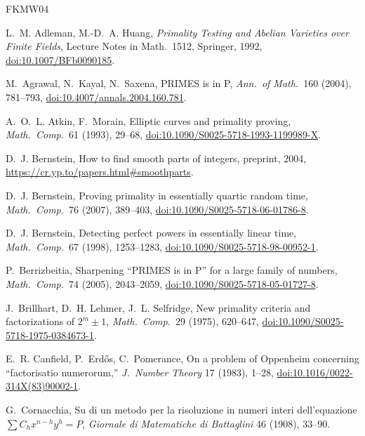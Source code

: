 \documentclass[11pt]{amsart}
\theoremstyle{plain}
\theoremstyle{definition}
\theoremstyle{remark}
\begin{document}
\begin{thebibliography}{FKMW04}

 L.~M. Adleman, M.-D.~A. Huang, \emph{Primality Testing and Abelian Varieties over
Finite Fields}, Lecture Notes in Math.\ 1512, Springer, 1992, \href{https://doi.org/10.1007/BFb0090185}{doi:10.1007/BFb0090185}.

 M.~Agrawal, N.~Kayal, N.~Saxena, PRIMES is in P, \emph{Ann.\ of Math.}\ 160
(2004), 781--793, \href{https://doi.org/10.4007/annals.2004.160.781}{doi:10.4007/annals.2004.160.781}.

 A.~O.~L. Atkin, F.~Morain, Elliptic curves and primality proving, \emph{Math.\
Comp.}\ 61 (1993), 29--68, \href{https://doi.org/10.1090/S0025-5718-1993-1199989-X}{doi:10.1090/S0025-5718-1993-1199989-X}.

 D.~J. Bernstein, How to find smooth parts of integers, preprint, 2004,
\url{https://cr.yp.to/papers.html#smoothparts}.

 D.~J. Bernstein, Proving primality in essentially quartic random time,
\emph{Math.\ Comp.}\ 76 (2007), 389--403, \href{https://doi.org/10.1090/S0025-5718-06-01786-8}{doi:10.1090/S0025-5718-06-01786-8}.

 D.~J. Bernstein, Detecting perfect powers in essentially linear time,
\emph{Math.\ Comp.}\ 67 (1998), 1253--1283, \href{https://doi.org/10.1090/S0025-5718-98-00952-1}{doi:10.1090/S0025-5718-98-00952-1}.

 P.~Berrizbeitia, Sharpening ``PRIMES is in P'' for a large family of
numbers, \emph{Math.\ Comp.}\ 74 (2005), 2043--2059, \href{https://doi.org/10.1090/S0025-5718-05-01727-8}{doi:10.1090/S0025-5718-05-01727-8}.

 J.~Brillhart, D.~H. Lehmer, J.~L. Selfridge, New primality criteria and
factorizations of $2^m\pm 1$, \emph{Math.\ Comp.}\ 29 (1975), 620--647, \href{https://doi.org/10.1090/S0025-5718-1975-0384673-1}{doi:10.1090/S0025-5718-1975-0384673-1}.

 E.~R. Canfield, P.~Erd\H{o}s, C.~Pomerance, On a problem of Oppenheim concerning
``factorisatio numerorum,'' \emph{J.~Number Theory} 17 (1983), 1--28, \href{https://doi.org/10.1016/0022-314X(83)90002-1}{doi:10.1016/0022-314X(83)90002-1}.

 G.~Cornacchia, Su di un metodo per la risoluzione in numeri interi
dell'equazione $\sum C_h x^{n-h}y^h = P$, \emph{Giornale di Matematiche di Battaglini} 46 (1908),
33--90.


\end{thebibliography}
\end{document}
